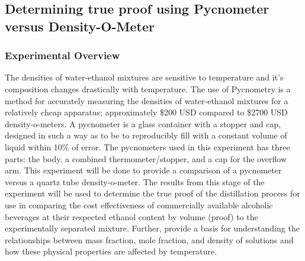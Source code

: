 \documentclass[peerreview, a4paper, 12pt]{IEEEtran}
\begin{document}
\subsection{\textbf{Determining true proof using Pycnometer versus Density-O-Meter}}
\subsubsection{\textbf{Experimental Overview}}
The densities of water-ethanol mixtures are sensitive to temperature and it’s composition changes drastically with temperature. The use of Pycnometry is a method for accurately measuring the densities of water-ethanol mixtures for a relatively cheap apparatus; approximately \$200 USD compared to \$2700 USD density-o-meters. A pycnometer is a glass container with a stopper and cap, designed in such a way as to be to reproducibly fill with a constant volume of liquid within 10\% of error. The pycnometers used in this experiment has three parts: the body, a combined thermometer/stopper, and a cap for the overflow arm. This experiment will be done to provide a comparison of a pycnometer versus a quartz tube density-o-meter. The results from this stage of the experiment will be used to determine the true proof of the distillation process for use in comparing the cost effectiveness of commercially available alcoholic beverages at their respected ethanol content by volume (proof) to the experimentally separated mixture. Further, provide a basis for understanding the relationships between mass fraction, mole fraction, and density of solutions and how these physical properties are affected by temperature.
\end{document}
